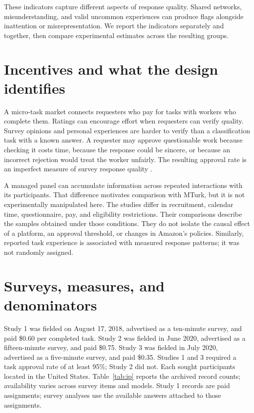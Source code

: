 \documentclass[11pt]{article}
\begin{document}
These indicators capture different aspects of response quality. Shared networks, misunderstanding, and valid uncommon experiences can produce flags alongside inattention or misrepresentation. We report the indicators separately and together, then compare experimental estimates across the resulting groups.

\section{Incentives and what the design identifies}

A micro-task market connects requesters who pay for tasks with workers who complete them. Ratings can encourage effort when requesters can verify quality. Survey opinions and personal experiences are harder to verify than a classification task with a known answer. A requester may approve questionable work because checking it costs time, because the response could be sincere, or because an incorrect rejection would treat the worker unfairly. The resulting approval rate is an imperfect measure of survey response quality \citep{akerlof1978market,peer_2014}.

A managed panel can accumulate information across repeated interactions with its participants. That difference motivates comparison with MTurk, but it is not experimentally manipulated here. The studies differ in recruitment, calendar time, questionnaire, pay, and eligibility restrictions. Their comparisons describe the samples obtained under those conditions. They do not isolate the causal effect of a platform, an approval threshold, or changes in Amazon's policies. Similarly, reported task experience is associated with measured response patterns; it was not randomly assigned.

\section{Surveys, measures, and denominators}

Study 1 was fielded on August 17, 2018, advertised as a ten-minute survey, and paid \$0.60 per completed task. Study 2 was fielded in June 2020, advertised as a fifteen-minute survey, and paid \$0.75. Study 3 was fielded in July 2020, advertised as a five-minute survey, and paid \$0.35. Studies 1 and 3 required a task approval rate of at least 95\%; Study 2 did not. Each sought participants located in the United States. Table~\ref{tab:ip} reports the archived record counts; availability varies across survey items and models. Study 1 records are paid assignments; survey analyses use the available answers attached to those assignments.
\end{document}

